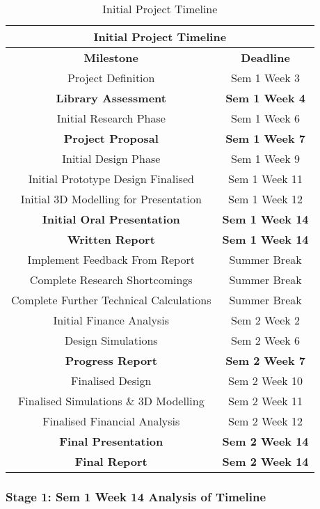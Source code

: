 \begin{table}[H]
\centering
\begin{tabular}{||c c||} 
 \hline
 \multicolumn{2}{|c|}{\textbf{Initial Project Timeline}} \\ [0.5ex] 
 \hline\hline
 \textbf{Milestone} & \textbf{Deadline} \\ 
 \hline\hline
 Project Definition 						& Sem 1 Week 3 \\ 
 \textbf{Library Assessment} 				& \textbf{Sem 1 Week 4} \\
 Initial Research Phase 					& Sem 1 Week 6 \\
 \textbf{Project Proposal} 					& \textbf{Sem 1 Week 7} \\
 Initial Design Phase 						& Sem 1 Week 9 \\
 Initial Prototype Design Finalised 		& Sem 1 Week 11 \\
 Initial 3D Modelling for Presentation 		& Sem 1 Week 12 \\
 \textbf{Initial Oral Presentation} 		& \textbf{Sem 1 Week 14} \\ 
 \textbf{Written Report} 					& \textbf{Sem 1 Week 14} \\ 
 Implement Feedback From Report 			& Summer Break \\
 Complete Research Shortcomings 			& Summer Break \\
 Complete Further Technical Calculations 	& Summer Break \\
 Initial Finance Analysis 					& Sem 2 Week 2 \\
 Design Simulations 						& Sem 2 Week 6 \\
 \textbf{Progress Report} 					& \textbf{Sem 2 Week 7} \\
 Finalised Design 							& Sem 2 Week 10 \\
 Finalised Simulations \& 3D Modelling 		& Sem 2 Week 11 \\
 Finalised Financial Analysis				& Sem 2 Week 12 \\
 \textbf{Final Presentation} 				& \textbf{Sem 2 Week 14} \\
 \textbf{Final Report} 						& \textbf{Sem 2 Week 14} \\ [1ex] 
 \hline
\end{tabular}
\caption{Initial Project Timeline}
\label{table:milestones_1}
\end{table}    

\subsubsection{Stage 1: Sem 1 Week 14 Analysis of Timeline}


